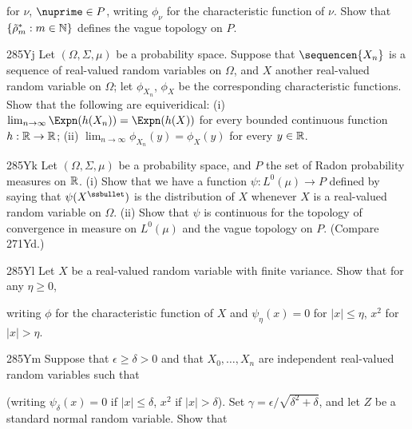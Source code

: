 {

\noindent for $\nu$, $\nuprime\in P$, writing $\phi_{\nu}$ for the
characteristic function of $\nu$.   Show that
$\{\tilde\rho^*_m:m\in\Bbb N\}$ defines the vague topology on $P$.

\spheader 285Yj Let $(\Omega,\Sigma,\mu)$ be a probability space.
Suppose that $\sequencen{X_n}$ is a sequence of real-valued random
variables on $\Omega$,
and $X$ another real-valued random variable on $\Omega$;  let $\phi_{X_n}$,
$\phi_X$ be the corresponding characteristic functions.   Show that the
following are equiveridical:
(i) $\lim_{n\to\infty}\Expn(h(X_n))=\Expn(h(X))$ for every bounded
continuous function $h:\Bbb R\to\Bbb R$;  (ii)
$\lim_{n\to\infty}\phi_{X_n}(y)=\phi_X(y)$ for every $y\in\Bbb R$.

\spheader 285Yk Let $(\Omega,\Sigma,\mu)$ be a probability space, and $P$
the set of Radon probability measures on $\Bbb R$.   (i) Show that we have
a function $\psi:L^0(\mu)\to P$ defined by saying that
$\psi(X^{\ssbullet})$ is the distribution of $X$ whenever $X$ is a
real-valued random variable on $\Omega$.   (ii) Show that $\psi$ is
continuous for the topology of convergence in measure on $L^0(\mu)$ and the
vague topology on $P$.   (Compare 271Yd.)

\spheader 285Yl Let $X$ be a real-valued random variable with
finite variance.   Show that for any $\eta\ge 0$,


\noindent writing $\phi$ for the characteristic function of $X$ and
$\psi_{\eta}(x)=0$ for $|x|\le\eta$, $x^2$ for $|x|>\eta$.

\spheader 285Ym Suppose that $\epsilon\ge\delta>0$ and that
$X_0,\ldots,X_n$ are independent
real-valued random variables such that


\noindent (writing $\psi_{\delta}(x)=0$ if $|x|\le\delta$, $x^2$ if
$|x|>\delta$).   Set $\gamma=\epsilon/\sqrt{\delta^2+\delta}$, and let
$Z$ be a standard normal random variable.   Show that


}
